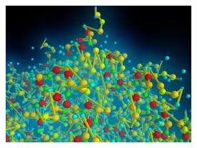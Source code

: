 \documentclass[compress=true]{beamer}
\begin{document}
\begin{frame}
\begin{columns}
\begin{column}{0.5\textwidth}
\begin{figure}
			\end{figure}
		\end{column}
		\begin{column}{0.5\textwidth}
			\begin{figure}
				\includegraphics[height=0.35\textheight]{mayavi_7.png}
			\end{figure}
		\end{column}
	\end{columns}
\end{frame}
\end{document}
